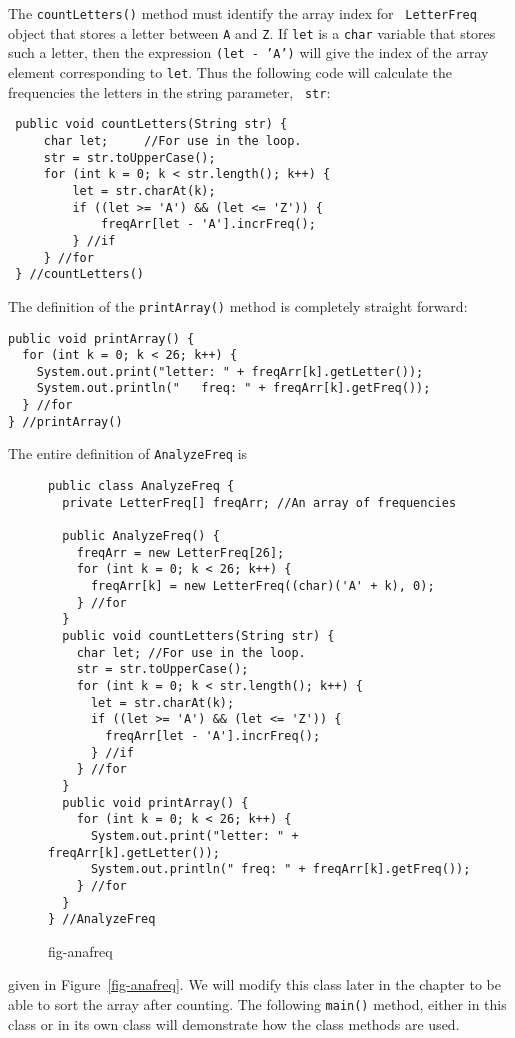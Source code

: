 \noindent The {\tt countLetters()} method must identify the array index for {\tt
LetterFreq} object that stores a letter between {\tt A} and {\tt Z}.
If {\tt let} is a {\tt char} variable that stores such a letter, then
the expression {\tt (let - 'A')} will give the index of the array
element corresponding to {\tt let}.  Thus the following code will
calculate the frequencies the letters in the string parameter, {\tt
str}:

\begin{jjjlisting}
\begin{lstlisting}
 public void countLetters(String str) {
     char let;     //For use in the loop.
     str = str.toUpperCase();
     for (int k = 0; k < str.length(); k++) {
         let = str.charAt(k);
         if ((let >= 'A') && (let <= 'Z')) {
             freqArr[let - 'A'].incrFreq();
         } //if
     } //for
 } //countLetters()
\end{lstlisting}
\end{jjjlisting}

\noindent The definition of the {\tt printArray()} method is completely
straight forward:

\begin{jjjlisting}
\begin{lstlisting}
public void printArray() {
  for (int k = 0; k < 26; k++) {
    System.out.print("letter: " + freqArr[k].getLetter());
    System.out.println("   freq: " + freqArr[k].getFreq());
  } //for
} //printArray()
\end{lstlisting}
\end{jjjlisting}

\noindent The entire definition of {\tt AnalyzeFreq} is
\begin{figure}[tb]
\jjjprogstart
\begin{jjjlisting}[26.5pc]
\begin{lstlisting}
public class AnalyzeFreq {
  private LetterFreq[] freqArr; //An array of frequencies

  public AnalyzeFreq() {
    freqArr = new LetterFreq[26];
    for (int k = 0; k < 26; k++) {
      freqArr[k] = new LetterFreq((char)('A' + k), 0);
    } //for
  }
  public void countLetters(String str) {
    char let; //For use in the loop.
    str = str.toUpperCase();
    for (int k = 0; k < str.length(); k++) {
      let = str.charAt(k);
      if ((let >= 'A') && (let <= 'Z')) {
        freqArr[let - 'A'].incrFreq();
      } //if
    } //for
  }
  public void printArray() {
    for (int k = 0; k < 26; k++) {
      System.out.print("letter: " + freqArr[k].getLetter());
      System.out.println(" freq: " + freqArr[k].getFreq());
    } //for
  } 
} //AnalyzeFreq
\end{lstlisting}
\end{jjjlisting}
{fig-anafreq}
\end{figure}
\noindent given in Figure~\ref{fig-anafreq}. We will modify this class later in
the chapter to be able to sort the array after counting.  The
following {\tt main()} method, either in this class or in its own
class will demonstrate how the class methods are used.

